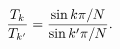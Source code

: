 \begin{equation}    
{T_k\over T_{k^\prime}}={\sin k \pi /N\over \sin k^\prime \pi /N} .   
\label{sine2} \end{equation} 
